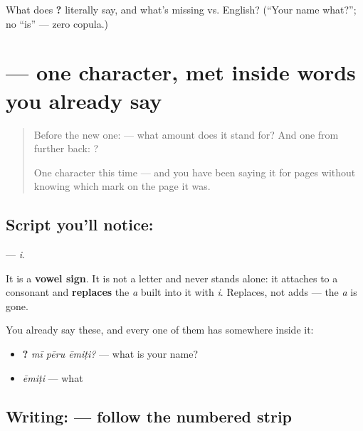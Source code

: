 \begin{tcolorbox}[breakable,colback=teal!4,colframe=teal!35!black,title={Before you move on}]
What does \textbf{  ?} literally say, and what's missing vs. English? (\textquotedblleft{}Your name what?\textquotedblright{}; no \textquotedblleft{}is\textquotedblright{} — zero copula.)
\end{tcolorbox}
\section[\texorpdfstring{\te{ి} (i)}{ి (i)}]{ — one character, met inside words you already say}

\label{lesson:TE-S08-vowel-sign-i}



\begin{quote}
Before the new one:  — what amount does it stand for? And one from further back: ?

One character this time — and you have been saying it for pages without knowing which mark on the page it was.
\end{quote}

\subsection*{Script you'll notice: }
\textbf{} — \emph{i}.

It is a \textbf{vowel sign}. It is not a letter and never stands alone: it attaches to a consonant and \textbf{replaces} the \emph{a} built into it with \emph{i}. Replaces, not adds — the \emph{a} is gone.

You already say these, and every one of them has  somewhere inside it:

\begin{itemize}
\raggedright
  \item \textbf{  ?} \emph{mī pēru ēmiṭi?} — what is your name?
  \item \textbf{} \emph{ēmiṭi} — what
\end{itemize}

\subsection*{Writing:  — follow the numbered strip}

